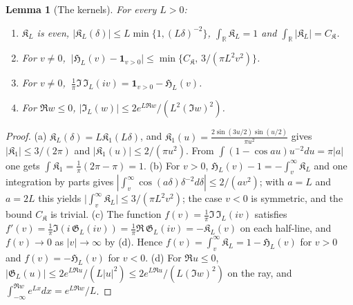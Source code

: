 \documentclass[11pt,a4paper]{article}
\numberwithin{equation}{section}
\newtheorem{lemma}[theorem]{Lemma}
\theoremstyle{definition}
\theoremstyle{remark}
\begin{document}
\begin{lemma}[The kernels]\label{lem:taucw-kernel}
For every $L>0$:
\begin{enumerate}[label=(\alph*),leftmargin=*]
\item $\mathfrak K_L$ is even, $|\mathfrak K_L(\delta)|\le L\min\{1,(L\delta)^{-2}\}$, $\int_{\mathbb R}\mathfrak K_L=1$ and $\int_{\mathbb R}|\mathfrak K_L|=C_{\mathfrak K}$.
\item For $v\neq0$, $\ \bigl|\mathfrak H_L(v)-\mathbf 1_{v>0}\bigr|\le\min\{C_{\mathfrak K},\,3/(\pi L^2v^2)\}$.
\item For $v\ne0$, $\ \frac1\pi\Im\,\mathfrak I_L(iv)=\mathbf 1_{v>0}-\mathfrak H_L(v)$.
\item For $\Re w\le0$, $|\mathfrak I_L(w)|\le2e^{L\Re w}/(L^2(\Im w)^2)$.
\end{enumerate}
\end{lemma}
\begin{proof}
(a) $\mathfrak K_L(\delta)=L\mathfrak K_1(L\delta)$, and $\mathfrak K_1(u)=\frac{2\sin(3u/2)\sin(u/2)}{\pi u^2}$ gives $|\mathfrak K_1|\le3/(2\pi)$ and $|\mathfrak K_1(u)|\le2/(\pi u^2)$. From $\int(1-\cos au)u^{-2}du=\pi|a|$ one gets $\int\mathfrak K_1=\frac1\pi(2\pi-\pi)=1$. (b) For $v>0$, $\mathfrak H_L(v)-1=-\int_v^\infty\mathfrak K_L$ and one integration by parts gives $|\int_v^\infty\cos(a\delta)\delta^{-2}d\delta|\le2/(av^2)$; with $a=L$ and $a=2L$ this yields $\bigl|\int_v^\infty\mathfrak K_L\bigr|\le3/(\pi L^2v^2)$; the case $v<0$ is symmetric, and the bound $C_{\mathfrak K}$ is trivial. (c) The function $f(v)=\frac1\pi\Im\,\mathfrak I_L(iv)$ satisfies $f'(v)=\frac1\pi\Im(i\,\mathfrak G_L(iv))=\frac1\pi\Re\,\mathfrak G_L(iv)=-\mathfrak K_L(v)$ on each half-line, and $f(v)\to0$ as $|v|\to\infty$ by (d). Hence $f(v)=\int_v^\infty\mathfrak K_L=1-\mathfrak H_L(v)$ for $v>0$ and $f(v)=-\mathfrak H_L(v)$ for $v<0$. (d) For $\Re u\le0$, $|\mathfrak G_L(u)|\le2e^{L\Re u}/(L|u|^2)\le2e^{L\Re u}/(L(\Im w)^2)$ on the ray, and $\int_{-\infty}^{\Re w}e^{Lx}dx=e^{L\Re w}/L$.
\end{proof}
\end{document}
